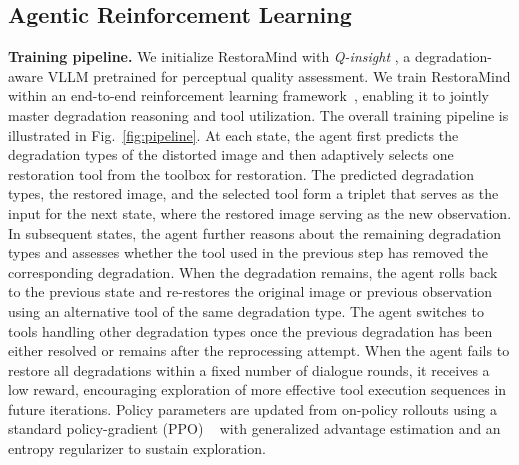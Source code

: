 

\subsection{Agentic Reinforcement Learning}
\noindent\textbf{Training pipeline.}
We initialize RestoraMind with \emph{Q-insight} \cite{li2025q}, a degradation-aware VLLM pretrained for perceptual quality assessment. We train RestoraMind within an end-to-end reinforcement learning framework~\cite{sheng2025hybridflow}, enabling it to jointly master degradation reasoning and tool utilization. The overall training pipeline is illustrated in Fig.~\ref{fig:pipeline}. At each state, the agent first predicts the degradation types of the distorted image and then adaptively selects one restoration tool from the toolbox for restoration. The predicted degradation types, the restored image, and the selected tool form a triplet that serves as the input for the next state, where the restored image serving as the new observation. In subsequent states, the agent further reasons about the remaining degradation types and assesses whether the tool used in the previous step has removed the corresponding degradation. When the degradation remains, the agent rolls back to the previous state and re-restores the original image or previous observation using an alternative tool of the same degradation type. The agent switches to tools handling other degradation types once the previous degradation has been either resolved or remains after the reprocessing attempt. When the agent fails to restore all degradations within a fixed number of dialogue rounds, it receives a low reward, encouraging exploration of more effective tool execution sequences in future iterations. Policy parameters are updated from on-policy rollouts using a standard policy-gradient (PPO) ~\cite{schulman2017proximal} with generalized advantage estimation and an entropy regularizer to sustain exploration. 

